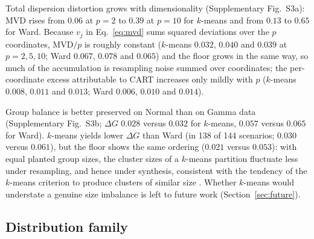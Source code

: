 \documentclass[pdflatex,referee]{sn-jnl}
\begin{document}
\begin{table}[!tbp]
\centering
\caption{Geometric fidelity after CART synthesis (observed), under bootstrap
         resampling of the original data (floor, $B = 30$) and their
         difference (excess), averaged over the 144 scenario means, at the
         planted $k$. MCD, MVD and $\Delta G$ are in the units of the scaler
         fit on the original data; $\mathrm{MCD}_{\mathrm{sd}}$ is in
         within-component standard deviations and RVD is a relative error.
         Last column: Wilcoxon $p$ for the excess of $k$-means against the
         excess of Ward across the 144 scenarios. Values by separation,
         distribution family and dimensionality are in Supplementary
         Section~S5.}
\label{tab:floor}
\small

\end{table}

Total dispersion distortion grows with dimensionality (Supplementary
Fig.~S3a): MVD rises from $0.06$ at $p = 2$ to $0.39$ at $p = 10$ for $k$-means
and from $0.13$ to $0.65$ for Ward. Because $v_j$ in Eq.~\eqref{eq:mvd} sums
squared deviations over the $p$ coordinates, $\mathrm{MVD}/p$ is roughly
constant ($k$-means $0.032$, $0.040$ and $0.039$ at $p = 2, 5, 10$; Ward
$0.067$, $0.078$ and $0.065$) and the floor grows in the same way, so much of
the accumulation is resampling noise summed over coordinates; the
per-coordinate excess attributable to CART increases only mildly with $p$
($k$-means $0.008$, $0.011$ and $0.013$; Ward $0.006$, $0.010$ and $0.014$).

Group balance is better preserved on Normal than on Gamma data (Supplementary
Fig.~S3b; $\Delta G$ $0.028$ versus $0.032$ for $k$-means, $0.057$ versus
$0.065$ for Ward). $k$-means yields lower $\Delta G$ than Ward (in 138 of 144
scenarios; $0.030$ versus $0.061$), but the floor shows the same ordering
($0.021$ versus $0.053$): with equal planted group sizes, the cluster sizes of
a $k$-means partition fluctuate less under resampling, and hence under
synthesis, consistent with the tendency of the $k$-means criterion to produce
clusters of similar size \citep{xiong2009}. Whether $k$-means would understate
a genuine size imbalance is left to future work (Section~\ref{sec:future}).

\subsection{Distribution family}
\label{sec:distribution}
\end{document}
